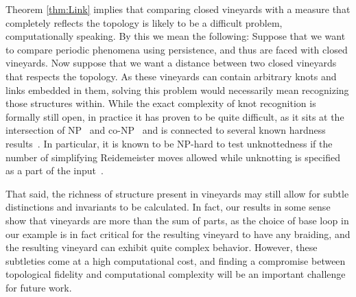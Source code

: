 \documentclass[twoside,leqno]{article}
\begin{document}
Theorem \ref{thm:Link} implies that comparing closed vineyards with a measure that completely reflects the topology is likely to be a difficult problem, computationally speaking. By this we mean the following: Suppose that we want to compare periodic phenomena using persistence, and thus are faced with closed vineyards. Now suppose that we want a distance between two closed vineyards that respects the topology. As these vineyards can contain arbitrary knots and links embedded in them, solving this problem would necessarily mean recognizing those structures within.
While the exact complexity of knot recognition is formally still open, in practice it has proven to be quite difficult, as it sits at the intersection of NP~\cite{Ichihara2023,hass1997algorithms} and co-NP~\cite{Lackenby2021} and is connected to several known hardness results~\cite{Koenig2021}.  In particular, it is known to be NP-hard to test unknottedness if the number of simplifying Reidemeister moves allowed while unknotting is specified as a part of the input~\cite{deMesmay2021}.


That said, the richness of structure present in vineyards may still allow for subtle distinctions and invariants to be calculated.  In fact, our results in some sense show that vineyards are more than the sum of parts, as the choice of base loop in our example is in fact critical for the resulting vineyard to have any braiding, and the resulting vineyard can exhibit quite complex behavior.
However, these subtleties come at a high computational cost, and finding a compromise between topological fidelity and computational complexity will be an important challenge for future work. 
\end{document}
